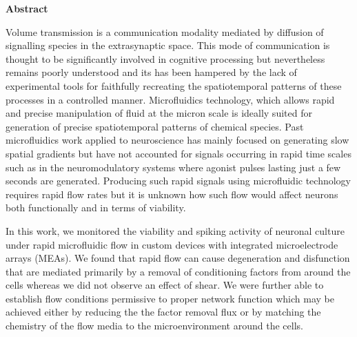 \vspace*{1.5cm}

{\Huge\textbf{Abstract}}

\vspace*{1.5cm}

Volume transmission is a communication modality mediated by diffusion of signalling species in the extrasynaptic space. This mode of communication is thought to be significantly involved in cognitive processing but nevertheless remains poorly understood and its has been hampered by the lack of experimental tools for faithfully recreating the spatiotemporal patterns of these processes in a controlled manner. Microfluidics technology, which allows rapid and precise manipulation of fluid at the micron scale is ideally suited for generation of precise spatiotemporal patterns of chemical species. Past microfluidics work applied to neuroscience has mainly focused on generating slow spatial gradients but have not accounted for signals occurring in rapid time scales such as in the neuromodulatory systems where agonist pulses lasting just a few seconds are generated. Producing such rapid signals using microfluidic technology requires rapid flow rates but it is unknown how such flow would affect neurons both functionally and in terms of viability.

In this work, we monitored the viability and spiking activity of neuronal culture under rapid microfluidic flow in custom devices with integrated microelectrode arrays (MEAs). We found that rapid flow can cause degeneration and disfunction that are mediated primarily by a removal of conditioning factors from around the cells whereas we did not observe an effect of shear. We were further able to establish flow conditions permissive to proper network function which may be achieved either by reducing the the factor removal flux or by matching the chemistry of the flow media to the microenvironment around the cells. 

